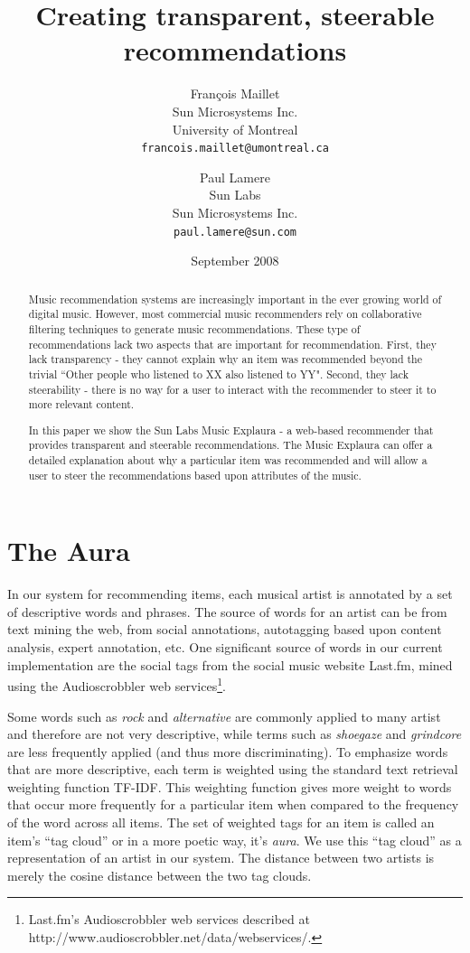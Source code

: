 \documentclass[letterpaper,10pt,twocolumn]{article}
\title{Creating transparent, steerable recommendations}
\author{
Fran\c{c}ois Maillet\\
Sun Microsystems Inc.\\
University of Montreal\\
\texttt{francois.maillet@umontreal.ca}
\and 
Paul Lamere \\
Sun Labs\\
Sun Microsystems Inc.\\
\texttt{paul.lamere@sun.com}
}
\date{September 2008}
\begin{document}
\maketitle

\begin{abstract}

Music recommendation systems are increasingly important in the ever 
    growing world of digital music.  However, most commercial music 
    recommenders rely on collaborative filtering techniques to generate 
    music recommendations. These type of recommendations lack two aspects 
    that are important for recommendation.  First, they lack transparency 
    - they cannot explain why an item was recommended beyond the trivial 
    ``Other people who listened to XX also listened to YY". Second, they 
    lack steerability - there is no way for a user to interact with the 
    recommender to steer it to more relevant content.
    
    In this paper we show the Sun Labs Music Explaura - a 
    web-based recommender that provides transparent and steerable 
    recommendations. The Music Explaura can offer a detailed explanation 
    about why a particular item was recommended and will allow a user to 
    steer the recommendations based upon attributes of the music.

\end{abstract}

\section{The Aura}

In our system for recommending items, each musical artist is annotated
by a set of descriptive words and phrases.  The source
of words for an artist can be from text mining the web, from social
annotations, autotagging based upon content analysis, expert
annotation, etc.  One significant source of words in our current
implementation are the social tags from the social music website
Last.fm, mined using the Audioscrobbler web services\footnote{Last.fm's
Audioscrobbler web services described at
http://www.audioscrobbler.net/data/webservices/.}.

Some words such as \textit{rock} and \textit{alternative} are
commonly applied to many artist and therefore are not very descriptive,
while terms such as \textit{shoegaze} and \textit{grindcore} are
less frequently applied (and thus more discriminating).  To emphasize
words that are more descriptive, each term is weighted using the
standard text retrieval weighting function TF-IDF\cite{tfidf}. This
weighting function gives more weight to words that occur more
frequently for a particular item when compared to the frequency of
the word across all items.  The set of weighted tags for an item
is called an item's ``tag cloud'' or in a more poetic way, it's
\textit{aura}.  We use this ``tag cloud'' as a representation of
an artist in our system. The distance between two artists is merely
the cosine distance between the two tag clouds\cite{cosine}.
\end{document}
